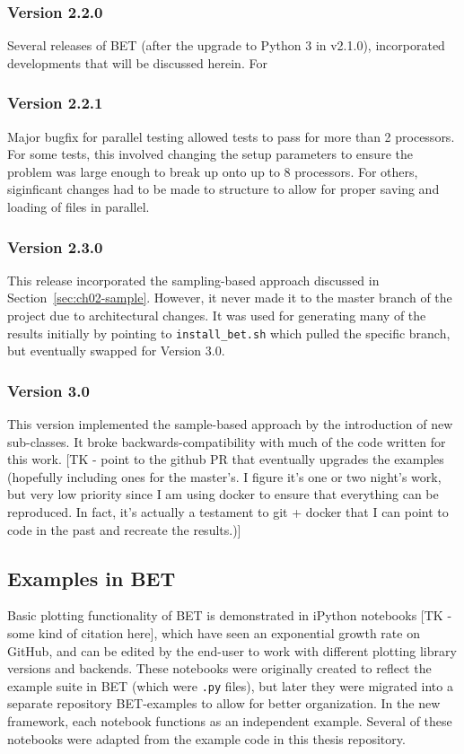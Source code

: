 \subsubsection{Version 2.2.0}
Several releases of BET (after the upgrade to Python 3 in v2.1.0), incorporated developments that will be discussed herein.
For


\subsubsection{Version 2.2.1}
Major bugfix for parallel testing allowed tests to pass for more than 2 processors.
For some tests, this involved changing the setup parameters to ensure the problem was large enough to break up onto up to 8 processors.
For others, siginficant changes had to be made to structure to allow for proper saving and loading of files in parallel.


\subsubsection{Version 2.3.0}
This release incorporated the sampling-based approach discussed in Section~\ref{sec:ch02-sample}.
However, it never made it to the master branch of the project due to architectural changes.
It was used for generating many of the results initially by pointing to {\tt install\_bet.sh} which pulled the specific branch, but eventually swapped for Version 3.0.

\subsubsection{Version 3.0}
This version implemented the sample-based approach by the introduction of new sub-classes.
It broke backwards-compatibility with much of the code written for this work.
[TK - point to the github PR that eventually upgrades the examples (hopefully including ones for the master's. I figure it's one or two night's work, but very low priority since I am using docker to ensure that everything can be reproduced. In fact, it's actually a testament to git + docker that I can point to code in the past and recreate the results.)]

\subsection{Examples in BET}
Basic plotting functionality of BET is demonstrated in iPython notebooks [TK - some kind of citation here], which have seen an exponential growth rate on GitHub, and can be edited by the end-user to work with different plotting library versions and backends.
These notebooks were originally created to reflect the example suite in BET (which were {\tt .py} files), but later they were migrated into a separate repository BET-examples to allow for better organization.
In the new framework, each notebook functions as an independent example.
Several of these notebooks were adapted from the example code in this thesis repository.
